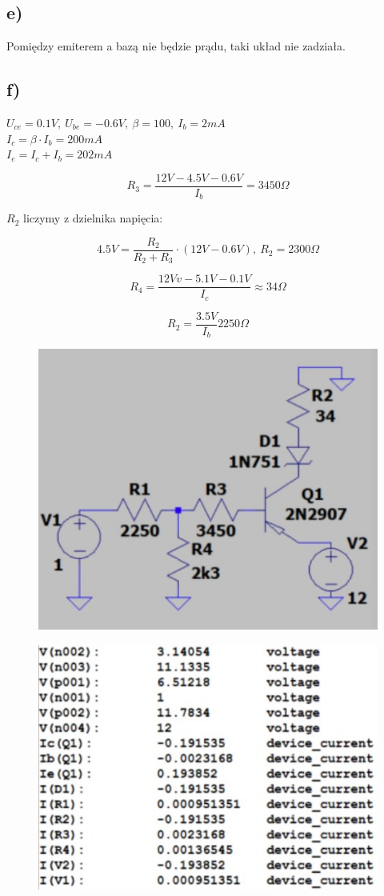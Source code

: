 \documentclass{article}
\begin{document}
\subsection{e)}
Pomiędzy emiterem a bazą nie będzie prądu, taki układ nie zadziała.

\newpage

\subsection{f)}

$U_{ce} = 0.1V, \ U_{be} = -0.6V, \ \beta = 100, \ I_{b} = 2mA$\\
$I_{c}=\beta \cdot I_{b} = 200mA$\\
$I_{e}=I_{c}+I_{b}=202mA$

$$
    R_{3} = \frac{12V-4.5V-0.6V}{I_{b}}=3450\Omega
$$

$R_{2}$ liczymy z dzielnika napięcia:

$$
    4.5V = \frac{R_{2}}{R_{2}+R_{3}}\cdot (12V-0.6V), \ R_{2} = 2300\Omega
$$

$$
    R_{4} = \frac{12Vv-5.1V-0.1V}{I_{c}}\approx 34\Omega
$$

$$
    R_{2}=\frac{3.5V}{I_{b}}2250\Omega
$$

\begin{figure}[h!]
    \centering
    \includegraphics[scale=0.35]{rys7_model.jpg}
\end{figure}


\begin{figure}[h!]
    \centering
    \includegraphics[scale=0.4]{rys7_num.jpg}
\end{figure}
\end{document}
